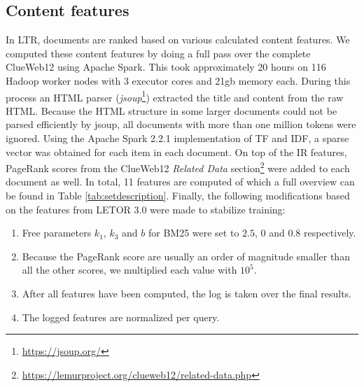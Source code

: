\subsection{Content features} \label{sec:contentfeature}
In LTR, documents are ranked based on various calculated content features. We computed these content features by doing a full pass over the complete ClueWeb12 using Apache Spark. This took approximately 20 hours on 116 Hadoop worker nodes with 3 executor cores and 21gb memory each. During this process an HTML parser (\textit{jsoup}\footnote{{\url{https://jsoup.org/}}}) extracted the title and content from the raw HTML. Because the HTML structure in some larger documents could not be parsed efficiently by jsoup, all documents with more than one million tokens were ignored. Using the Apache Spark 2.2.1 implementation of TF and IDF, a sparse vector was obtained for each item in each document.  On top of the IR features, PageRank scores from the ClueWeb12 \textit{Related Data} section\footnote{{\url{https://lemurproject.org/clueweb12/related-data.php}}} were added to each document as well. In total, 11 features are computed of which a full overview can be found in Table \ref{tab:setdescription}. Finally, the following modifications based on the features from LETOR 3.0 \cite{qin2010letor} were made to stabilize training:
\begin{enumerate}  
\item Free parameters $k_1$, $k_3$ and $b$ for BM25 were set to $2.5$, $0$ and $0.8$ respectively. 
\item Because the PageRank score are usually an order of magnitude smaller than all the other scores, we multiplied each value with $10^5$.
\item After all features have been computed, the log is taken over the final results.
\item The logged features are normalized per query.  
\end{enumerate}

